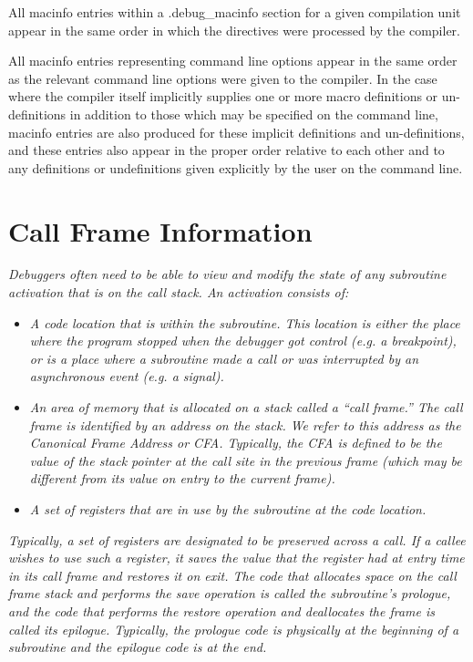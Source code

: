 All macinfo entries within a .debug\_macinfo section for a
given compilation unit appear in the same order in which the
directives were processed by the compiler.

All macinfo entries representing command line options appear
in the same order as the relevant command line options
were given to the compiler. In the case where the compiler
itself implicitly supplies one or more macro definitions or
un-definitions in addition to those which may be specified on
the command line, macinfo entries are also produced for these
implicit definitions and un-definitions, and these entries
also appear in the proper order relative to each other and
to any definitions or undefinitions given explicitly by the
user on the command line.



\section{Call Frame Information}
\label{chap:callframeinformation}




\textit{Debuggers often need to be able to view and modify the state of any subroutine activation that is
on the call stack. An activation consists of:}

\begin{itemize}
\item \textit{A code location that is within the
subroutine. This location is either the place where the program
stopped when the debugger got control (e.g. a breakpoint), or
is a place where a subroutine made a call or was interrupted
by an asynchronous event (e.g. a signal).}

\item \textit{An area of memory that is allocated on a stack called a
``call frame.'' The call frame is identified by an address
on the stack. We refer to this address as the Canonical
Frame Address or CFA. Typically, the CFA is defined to be the
value of the stack pointer at the call site in the previous
frame (which may be different from its value on entry to the
current frame).}

\item \textit{A set of registers that are in use by the subroutine
at the code location.}

\end{itemize}

\textit{Typically, a set of registers are designated to be preserved
across a call. If a callee wishes to use such a register, it
saves the value that the register had at entry time in its call
frame and restores it on exit. The code that allocates space
on the call frame stack and performs the save operation is
called the subroutine’s prologue, and the code that performs
the restore operation and deallocates the frame is called its
epilogue. Typically, the prologue code is physically at the
beginning of a subroutine and the epilogue code is at the end.}

